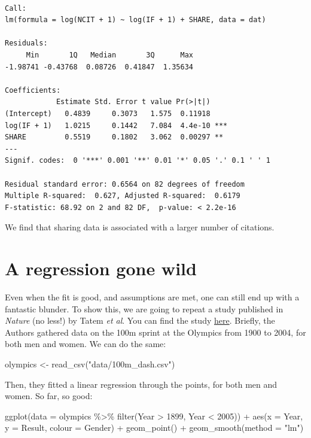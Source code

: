 \documentclass[
  letterpaper,
  DIV=11,
  numbers=noendperiod]{scrreprt}
\newenvironment{Shaded}{\begin{snugshade}}{\end{snugshade}}
\newcommand{\AttributeTok}[1]{\textcolor[rgb]{0.40,0.45,0.13}{#1}}
\newcommand{\DecValTok}[1]{\textcolor[rgb]{0.68,0.00,0.00}{#1}}
\newcommand{\FunctionTok}[1]{\textcolor[rgb]{0.28,0.35,0.67}{#1}}
\newcommand{\NormalTok}[1]{\textcolor[rgb]{0.00,0.23,0.31}{#1}}
\newcommand{\OtherTok}[1]{\textcolor[rgb]{0.00,0.23,0.31}{#1}}
\newcommand{\SpecialCharTok}[1]{\textcolor[rgb]{0.37,0.37,0.37}{#1}}
\newcommand{\StringTok}[1]{\textcolor[rgb]{0.13,0.47,0.30}{#1}}
\begin{document}
\begin{verbatim}

Call:
lm(formula = log(NCIT + 1) ~ log(IF + 1) + SHARE, data = dat)

Residuals:
     Min       1Q   Median       3Q      Max 
-1.98741 -0.43768  0.08726  0.41847  1.35634 

Coefficients:
            Estimate Std. Error t value Pr(>|t|)    
(Intercept)   0.4839     0.3073   1.575  0.11918    
log(IF + 1)   1.0215     0.1442   7.084  4.4e-10 ***
SHARE         0.5519     0.1802   3.062  0.00297 ** 
---
Signif. codes:  0 '***' 0.001 '**' 0.01 '*' 0.05 '.' 0.1 ' ' 1

Residual standard error: 0.6564 on 82 degrees of freedom
Multiple R-squared:  0.627, Adjusted R-squared:  0.6179 
F-statistic: 68.92 on 2 and 82 DF,  p-value: < 2.2e-16
\end{verbatim}

We find that sharing data is associated with a larger number of
citations.

\hypertarget{a-regression-gone-wild}{%
\section{A regression gone wild}\label{a-regression-gone-wild}}

Even when the fit is good, and assumptions are met, one can still end up
with a fantastic blunder. To show this, we are going to repeat a study
published in \emph{Nature} (no less!) by Tatem \emph{et al}. You can
find the study \href{https://www.nature.com/articles/431525a}{here}.
Briefly, the Authors gathered data on the 100m sprint at the Olympics
from 1900 to 2004, for both men and women. We can do the same:

\begin{Shaded}
\begin{Highlighting}[]
\NormalTok{olympics }\OtherTok{\textless{}{-}} \FunctionTok{read\_csv}\NormalTok{(}\StringTok{"data/100m\_dash.csv"}\NormalTok{)}
\end{Highlighting}
\end{Shaded}

Then, they fitted a linear regression through the points, for both men
and women. So far, so good:

\begin{Shaded}
\begin{Highlighting}[]
\FunctionTok{ggplot}\NormalTok{(}\AttributeTok{data =}\NormalTok{ olympics }\SpecialCharTok{\%\textgreater{}\%} \FunctionTok{filter}\NormalTok{(Year }\SpecialCharTok{\textgreater{}} \DecValTok{1899}\NormalTok{, Year }\SpecialCharTok{\textless{}} \DecValTok{2005}\NormalTok{)) }\SpecialCharTok{+} 
  \FunctionTok{aes}\NormalTok{(}\AttributeTok{x =}\NormalTok{ Year, }\AttributeTok{y =}\NormalTok{ Result, }\AttributeTok{colour =}\NormalTok{ Gender) }\SpecialCharTok{+} 
  \FunctionTok{geom\_point}\NormalTok{() }\SpecialCharTok{+} \FunctionTok{geom\_smooth}\NormalTok{(}\AttributeTok{method =} \StringTok{"lm"}\NormalTok{)}
\end{Highlighting}
\end{Shaded}
\end{document}
